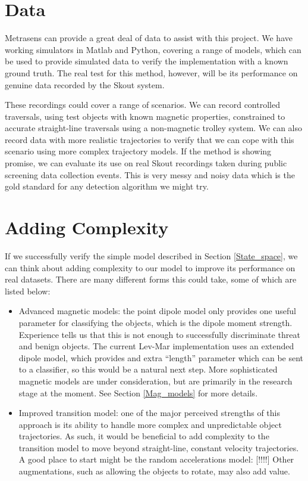 \documentclass[10pt, a4paper, twocolumn]{article} %
\begin{document}
\section{Data}

Metrasens can provide a great deal of data to assist with this project. We have working simulators in Matlab and Python, covering a range of models, which can be used to provide simulated data to verify the implementation with a known ground truth. The real test for this method, however, will be its performance on genuine data recorded by the Skout system.

These recordings could cover a range of scenarios. We can record controlled traversals, using test objects with known magnetic properties, constrained to accurate straight-line traversals using a non-magnetic trolley system. We can also record data with more realistic trajectories to verify that we can cope with this scenario using more complex trajectory models. If the method is showing promise, we can evaluate its use on real Skout recordings taken during public screening data collection events. This is very messy and noisy data which is the gold standard for any detection algorithm we might try.

\section{Adding Complexity}

If we successfully verify the simple model described in Section \ref{State_space}, we can think about adding complexity to our model to improve its performance on real datasets. There are many different forms this could take, some of which are listed below:

\begin{itemize}
	\item Advanced magnetic models: the point dipole model only provides one useful parameter for classifying the objects, which is the dipole moment strength. Experience tells us that this is not enough to successfully discriminate threat and benign objects. The current Lev-Mar implementation uses an extended dipole model, which provides and extra “length” parameter which can be sent to a classifier, so this would be a natural next step. More sophisticated magnetic models are under consideration, but are primarily in the research stage at the moment. See Section \ref{Mag_models} for more details.
	
	\item Improved transition model: one of the major perceived strengths of this approach is its ability to handle more complex and unpredictable object trajectories. As such, it would be beneficial to add complexity to the transition model to move beyond straight-line, constant velocity trajectories. A good place to start might be the random accelerations model: [!!!!] Other augmentations, such as allowing the objects to rotate, may also add value.
	
\end{itemize}
\end{document}
